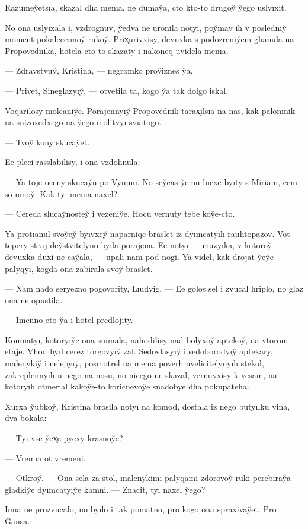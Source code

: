 \documentclass[10pt]{book}
\begin{document}
Razumey̆etsıa, skazal dlıa menıa, ne dumay̆a, cto kto-to drugoy̆ y̆ego uslyıxit.

No ona uslyıxala i, vzdrognuv, y̆edva ne uronila notyı, poy̆mav ih v posledniy̆ moment pokalecennoy̆ rukoy̆. Prix̨urivxisy, devuxka s podozreniy̆em glıanula na Propovednika, hotela cto-to skazaty i nakoneq uvidela menıa.

— Zdravstvuy̆, Kristina, — negromko proy̆iznes y̆a.

— Privet, Sineglazyıy̆, — otvetila ta, kogo y̆a tak dolgo iskal.

Voqarilosy molcaniy̆e. Porajennyıy̆ Propovednik tarax̨ilsıa na nas, kak palomnik na snizoxedxego na y̆ego molitvyı svıatogo.

— Tvoy̆ kony skucay̆et.

Ee pleci rasslabilisy, i ona vzdohnula:

— Ya toje oceny skucay̆u po Vyıunu. No sey̆cas y̆emu lucxe byıty s Miriam, cem so mnoy̆. Kak tyı menıa naxel?

— Cereda slucay̆nostey̆ i vezeniy̆e. Hocu vernuty tebe koy̆e-cto.

Ya protıanul svoy̆ey̆ byıvxey̆ naparniqe braslet iz dyımcatyıh rauhtopazov. Vot tepery straj dey̆stvitelyno byıla porajena. Ee notyı — muzyıka, v kotoroy̆ devuxka duxi ne cay̆ala, — upali nam pod nogi. Ya videl, kak drojat y̆ey̆e palyqyı, kogda ona zabirala svoy̆ braslet.

— Nam nado seryezno pogovority, Lıudvig. — Ee golos sel i zvucal hriplo, no glaz ona ne opustila.

— Imenno eto y̆a i hotel predlojity.



Komnatyı, kotoryıy̆e ona snimala, nahodilisy nad bolyxoy̆ aptekoy̆, na vtorom etaje. Vhod byıl cerez torgovyıy̆ zal. Sedovlasyıy̆ i sedoborodyıy̆ aptekary, malenykiy̆ i nelepyıy̆, posmotrel na menıa poverh uvelicitelynyıh stekol, zakreplennyıh u nego na nosu, no nicego ne skazal, vernuvxisy k vesam, na kotoryıh otmerıal kakoy̆e-to koricnevoy̆e snadobye dlıa pokupatelıa.

Xurxa y̆ubkoy̆, Kristina brosila notyı na komod, dostala iz nego butyılku vina, dva bokala:

— Tyı vse y̆ex̨e pyexy krasnoy̆e?

— Vremıa ot vremeni.

— Otkroy̆. — Ona sela za stol, malenykimi palyqami zdorovoy̆ ruki perebiray̆a gladkiy̆e dyımcatyıy̆e kamni. — Znacit, tyı naxel y̆ego?

Imıa ne prozvucalo, no byılo i tak ponıatno, pro kogo ona spraxivay̆et. Pro Gansa.
\end{document}
